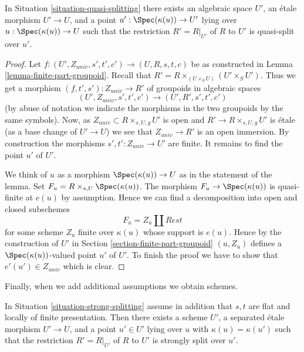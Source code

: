 \begin{lemma}
\label{lemma-quasi-splitting}
In Situation \ref{situation-quasi-splitting}
there exists an algebraic space $U'$, an \'etale morphism
$U' \to U$, and a point $u' : \Spec(\kappa(u)) \to U'$
lying over $u : \Spec(\kappa(u)) \to U$
such that the restriction $R' = R|_{U'}$ of $R$ to $U'$
is quasi-split over $u'$.
\end{lemma}

\begin{proof}
Let $f : (U', Z_{univ}, s', t', c') \to (U, R, s, t, c)$ be as constructed in
Lemma \ref{lemma-finite-part-groupoid}.
Recall that $R' = R \times_{(U \times_S U)} (U' \times_S U')$.
Thus we get a morphism $(f, t', s') : Z_{univ} \to R'$ of groupoids
in algebraic spaces
$$
(U', Z_{univ}, s', t', c') \to (U', R', s', t', c')
$$
(by abuse of notation we indicate the morphisms in the two groupoids
by the same symbols). Now, as $Z_{univ} \subset R \times_{s, U, g} U'$ is open
and $R' \to R \times_{s, U, g} U'$ is \'etale (as a base change
of $U' \to U$) we see that $Z_{univ} \to R'$ is an open immersion.
By construction the morphisms $s', t' : Z_{univ} \to U'$ are finite.
It remains to find the point $u'$ of $U'$.

\medskip\noindent
We think of $u$ as a morphism $\Spec(\kappa(u)) \to U$ as in
the statement of the lemma. Set $F_u = R \times_{s, U} \Spec(\kappa(u))$.
The morphism $F_u \to \Spec(\kappa(u))$ is quasi-finite at $e(u)$
by assumption. Hence we can find a decomposition into open and closed
subschemes
$$
F_u = Z_u \amalg Rest
$$
for some scheme $Z_u$ finite over $\kappa(u)$ whose support is $e(u)$.
Hence by the construction of $U'$ in
Section \ref{section-finite-part-groupoid}
$(u, Z_u)$ defines a $\Spec(\kappa(u))$-valued
point $u'$ of $U'$. To finish the proof we have to show that
$e'(u') \in Z_{univ}$ which is clear.
\end{proof}

\noindent
Finally, when we add additional assumptions we obtain schemes.

\begin{lemma}
\label{lemma-strong-splitting-scheme}
In Situation \ref{situation-strong-splitting} assume in addition that
$s, t$ are flat and locally of finite presentation.
Then there exists a scheme $U'$, a separated \'etale morphism
$U' \to U$, and a point $u' \in U'$
lying over $u$ with $\kappa(u) = \kappa(u')$
such that the restriction $R' = R|_{U'}$ of $R$ to $U'$
is strongly split over $u'$.
\end{lemma}

